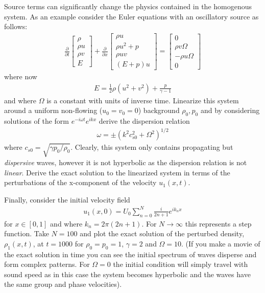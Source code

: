 \documentclass[12pt]{article}
\theoremstyle{definition}
\theoremstyle{definition}
\theoremstyle{definition}
\begin{document}
Source terms can significantly change the physics contained in the
homogenous system. As an example consider the Euler equations with an
oscillatory source as follows:
\begin{align*}
  \frac{\partial}{\partial{t}}
  \left[
    \begin{matrix}
      \rho \\
      \rho u \\
      \rho v \\      
      E
    \end{matrix}
  \right]
  +
  \frac{\partial}{\partial{x}}
  \left[
    \begin{matrix}
      \rho u \\
      \rho u^2 + p \\
      \rho u v \\
      (E+p)u
    \end{matrix}
  \right]
  =
  \left[
    \begin{matrix}
      0 \\
      \rho v\Omega \\
      -\rho u\Omega  \\
      0
    \end{matrix}
  \right]  
\end{align*}
where now
\begin{align*}
  E = \frac{1}{2}\rho (u^2+v^2) + \frac{p}{\gamma-1}
\end{align*}
and where $\Omega$ is a constant with units of inverse time. Linearize
this system around a uniform non-flowing ($u_0 = v_0 = 0$) background
$\rho_0, p_0$ and by considering solutions of the form
$e^{-i\omega t}e^{i kx }$ derive the dispersion relation
\begin{align*}
  \omega = \pm (k^2 c_{s0}^2 + \Omega^2)^{1/2}
\end{align*}
where $c_{s0} = \sqrt{\gamma p_0/\rho_0}$. Clearly, this system only
contains propagating but \emph{dispersive} waves, however it is not
hyperbolic as the dispersion relation is not \emph{linear}. Derive the
exact solution to the linearized system in terms of the perturbations
of the x-component of the velocity $u_1(x,t)$.

Finally, consider the initial velocity field
\begin{align*}
  u_1(x,0) = U_0 \sum_{n=0}^N \frac{i}{2n + 1} e^{i k_n x}
\end{align*}
for $x\in [0,1]$ and where $k_n = 2\pi (2n+1)$. For
$N\rightarrow \infty$ this represents a step function. Take $N=100$
and plot the exact solution of the perturbed density, $\rho_1(x,t)$,
at $t=1000$ for $\rho_0 = p_0 = 1$, $\gamma = 2$ and $\Omega =
10$. (If you make a movie of the exact solution in time you can see
the initial spectrum of waves disperse and form complex patterns. For
$\Omega = 0$ the initial condition will simply travel with sound speed
as in this case the system becomes hyperbolic and the waves have the
same group and phase velocities).
\end{document}
